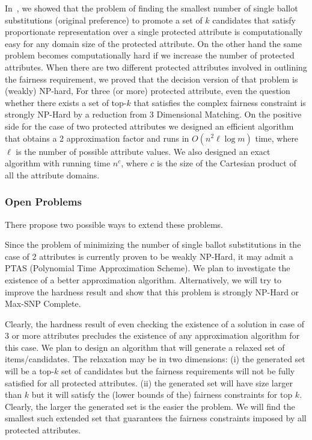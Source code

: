 \documentclass[11pt]{article}
\begin{document}
\noindent In~\cite{islam2022satisfying}, we showed that the problem of finding the smallest number of single ballot substitutions (original preference) to promote a set of $k$ candidates that satisfy proportionate representation over a single protected attribute is computationally easy for any domain size of the protected attribute. On the other hand the same problem becomes computationally hard if we increase the number of protected attributes. When there are two different protected attributes involved in outlining the fairness requirement, we proved that the decision version of that problem is (weakly) NP-hard, %
For three (or more) protected attribute, even the question whether there exists a set of top-$k$ that satisfies the complex fairness constraint is strongly NP-Hard by a reduction from 3 Dimensional Matching. On the positive side for the case of two protected attributes we designed an efficient algorithm that obtains a 2 approximation factor and runs in $O(n^2\ell \log m)$ time, 
where $\ell$ is the number of possible attribute values. We also designed an exact algorithm with running time $n^c$, where $c$ is the size of the Cartesian product of all the attribute domains.

\vspace{-0.1in}
\subsubsection{Open Problems}
\vspace{-0.1in}
There propose two possible ways to extend these problems.

\smallskip {} 
Since  the problem of minimizing the number of single ballot substitutions in the case of 2 attributes is currently proven to be weakly NP-Hard, it may admit a PTAS (Polynomial Time Approximation Scheme). We plan to investigate the existence of a better approximation algorithm. Alternatively, we will try to improve the hardness result and show that this problem is strongly NP-Hard or Max-SNP Complete. 

\smallskip {} 
Clearly, the hardness result of even checking the existence of a solution in case of 3 or more attributes precludes the existence of any approximation algorithm for this case. We plan to design an algorithm that will generate a relaxed set of items/candidates. The relaxation may be in two dimensions: (i) the generated set will be a top-$k$ set of candidates but the fairness requirements will not be fully satisfied for all protected attributes. (ii) the generated set will have size larger than $k$ but it will satisfy the (lower bounds of the) fairness constraints for top $k$. Clearly, the larger the generated set is the easier the problem. We will find the smallest such extended set that guarantees the fairness  constraints imposed by all protected attributes.
\end{document}
